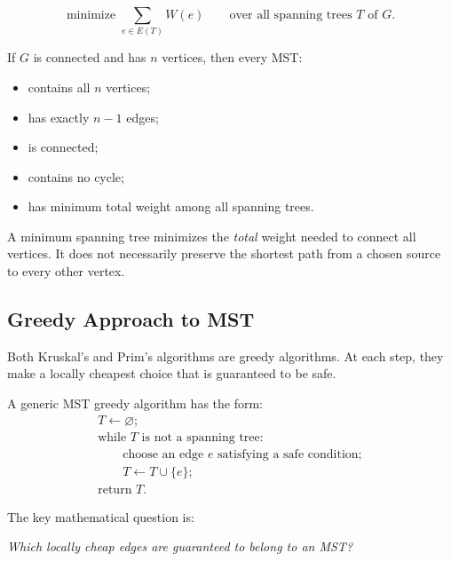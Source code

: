 \begin{keyformula}[title={MST objective}]
\[
\text{minimize }
\sum_{e\in E(T)}W(e)
\qquad
\text{over all spanning trees }T\text{ of }G.
\]
\end{keyformula}

\begin{examplebox}[title={What an MST must satisfy}]
If \(G\) is connected and has \(n\) vertices, then every MST:
\begin{itemize}[leftmargin=*]
    \item contains all \(n\) vertices;
    \item has exactly \(n-1\) edges;
    \item is connected;
    \item contains no cycle;
    \item has minimum total weight among all spanning trees.
\end{itemize}
\end{examplebox}

\begin{commonmistake}[title={MST is not usually a shortest-path tree}]
A minimum spanning tree minimizes the \emph{total} weight needed to connect all vertices. It does not necessarily preserve the shortest path from a chosen source to every other vertex.
\end{commonmistake}

\subsection{Greedy Approach to MST}

Both Kruskal's and Prim's algorithms are greedy algorithms. At each step, they make a locally cheapest choice that is guaranteed to be safe.

A generic MST greedy algorithm has the form:
\[
\begin{array}{l}
T\leftarrow \varnothing;\\
\text{while }T\text{ is not a spanning tree:}\\
\qquad \text{choose an edge }e\text{ satisfying a safe condition};\\
\qquad T\leftarrow T\cup\{e\};\\
\text{return }T.
\end{array}
\]

The key mathematical question is:

\begin{center}
\emph{Which locally cheap edges are guaranteed to belong to an MST?}
\end{center}

